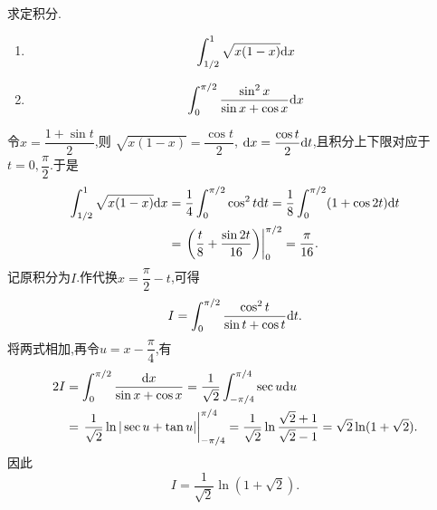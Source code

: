 \documentclass{ctexart}
\begin{document}
\begin{problem}[6.(12\songti{分})]
求定积分.
\begin{enumerate}[label=\tbf{(\alph*)},leftmargin=*,topsep=0pt,parsep=0pt,itemsep=0pt,partopsep=0pt]
\item \[\int_{1/2}^1\sqrt{x(1-x)}\mathrm{d} x\]
\item \[\int_0^{\pi/2}\dfrac{\sin^2x}{\sin x+\cos x}\mathrm{d} x\]
\end{enumerate}
\end{problem}
\begin{solution}
 令$x=\dfrac{1+\sin t}{2}$,则
$\sqrt{x(1-x)}=\dfrac{\cos t}{2}$,
$\mathrm{d} x=\dfrac{\cos t}{2}\mathrm{d} t$,且积分上下限对应于$t=0,\dfrac\pi2$.于是
\[
\begin{aligned}
\int_{1/2}^1\sqrt{x(1-x)}\mathrm{d} x
&=\dfrac14\int_0^{\pi/2}\cos^2t\mathrm{d} t
=\dfrac18\int_0^{\pi/2}(1+\cos2t)\mathrm{d} t\\
&=\left.\left(\dfrac t8+\dfrac{\sin2t}{16}\right)\right|_0^{\pi/2}
={\dfrac\pi{16}}.
\end{aligned}
\]
 记原积分为$I$.作代换$x=\dfrac\pi2-t$,可得
\[
I=\int_0^{\pi/2}\dfrac{\cos^2t}{\sin t+\cos t}\mathrm{d} t.
\]
将两式相加,再令$u=x-\dfrac\pi4$,有
\[
\begin{aligned}
2I
&=\int_0^{\pi/2}\dfrac{\mathrm{d} x}{\sin x+\cos x}
=\dfrac1{\sqrt2}\int_{-\pi/4}^{\pi/4}\sec u\mathrm{d} u\\
&=\left.\dfrac1{\sqrt2}\ln|\sec u+\tan u|\right|_{-\pi/4}^{\pi/4}
=\dfrac1{\sqrt2}\ln\dfrac{\sqrt2+1}{\sqrt2-1}
=\sqrt2\ln(1+\sqrt2).
\end{aligned}
\]
因此
\[
{I=\dfrac1{\sqrt2}\ln(1+\sqrt2).}
\]
\end{solution}
\end{document}
